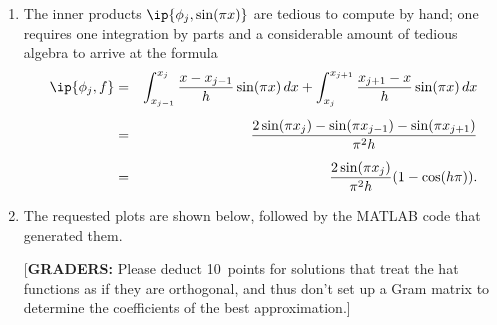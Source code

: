 {\begin{solution}
\begin{enumerate}
\begin{itemize}
     \end{itemize}
\item The inner products $\ip{\phi_j, \sin(\pi x)}$ are tedious to compute by hand;
      one requires one integration by parts and a considerable amount of tedious algebra
      to arrive at the formula
          \begin{eqnarray*}
              \ip{\phi_j, f} &=& \int_{x_{j-1}}^{x_j} {x-x_{j-1} \over h} \sin(\pi x)\, dx
                              + \int_{x_j}^{x_{j+1}} {x_{j+1}-x \over h} \sin(\pi x)\, dx \\[0.5em]
                             &=& {2 \sin(\pi x_j) - \sin(\pi x_{j-1}) - \sin(\pi x_{j+1}) 
                                   \over \pi^2 h} \\[0.5em]
                             &=& {2\sin(\pi x_j) \over \pi^2 h} (1 - \cos(h\pi)).
         \end{eqnarray*} 

\item The requested plots are shown below, followed by the MATLAB code that generated them.

\vspace*{1em}
{[\textbf{GRADERS:} Please deduct 10~points for solutions that treat the hat functions as if they are
orthogonal, and thus don't set up a Gram matrix to determine the coefficients of the best
approximation.]}


\end{enumerate}
\end{solution}}

